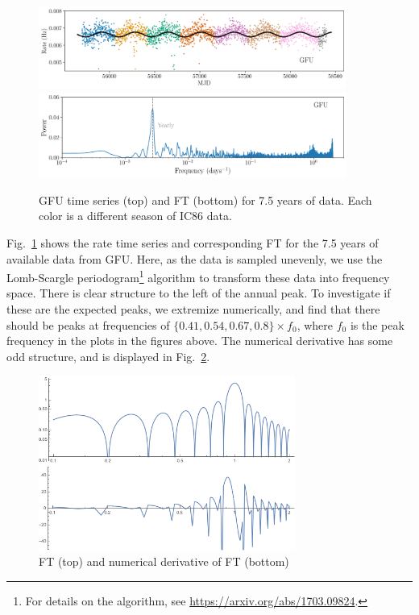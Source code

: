 \begin{figure}
    \centering
    \includegraphics[width=0.9\textwidth]{figures/seasonal/gfu_online_overall_with_model.png}
    \includegraphics[width=0.9\textwidth]{figures/seasonal/gfu_online_overall_FFT_maxima_False.png}
    \caption[GFU all sky rate]{GFU time series (top) and FT (bottom) for 7.5 years of data. Each color is a different season of IC86 data.}
    \label{fig:gfu_7_year_fft}
\end{figure}

Fig.~\ref{fig:gfu_7_year_fft} shows the rate time series and corresponding FT for the 7.5 years of available data from GFU. Here, as the data is sampled unevenly, we use the Lomb-Scargle periodogram\footnote{For details on the algorithm, see \url{https://arxiv.org/abs/1703.09824}.} algorithm to transform these data into frequency space. There is clear structure to the left of the annual peak. To investigate if these are the expected peaks, we extremize numerically, and find that there should be peaks at frequencies of $\{0.41,0.54,0.67,0.8\}\times f_0$, where $f_0$ is the peak frequency in the plots in the figures above. The numerical derivative has some odd structure, and is displayed in Fig.~\ref{fig:fft_derivative}.

\begin{figure}
    \centering
    \includegraphics[width=0.75\textwidth]{figures/seasonal/GFU_fft_with_derivative.png}
    \caption[Numerical derivative of FFT of windowed data]{FT (top) and numerical derivative of FT (bottom)}
    \label{fig:fft_derivative}
\end{figure}

